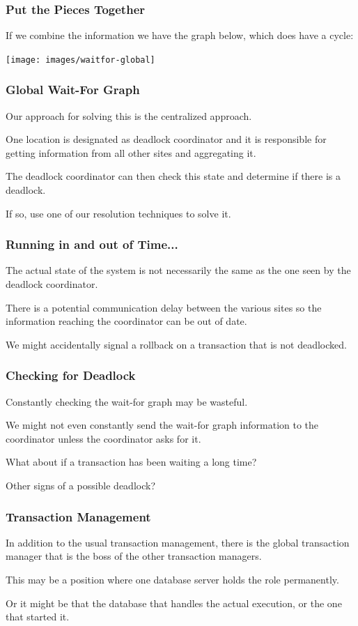 \begin{frame}
\frametitle{Put the Pieces Together}

If we combine the information we have the graph below, which does have a cycle:

\begin{center}
\texttt{[image: images/waitfor-global]}
\end{center}


\end{frame}

\begin{frame}
\frametitle{Global Wait-For Graph}

Our approach for solving this is the centralized approach.

One location is designated as deadlock coordinator and it is responsible for getting information from all other sites and aggregating it. 

The deadlock coordinator can then check this state and determine if there is a deadlock.

If so, use one of our resolution techniques to solve it.

\end{frame}

\begin{frame}
\frametitle{Running in and out of Time...}

The actual state of the system is not necessarily the same as the one seen by the deadlock coordinator. 

There is a potential communication delay between the various sites so the information reaching the coordinator can be out of date.

We might accidentally signal a rollback on a transaction that is not deadlocked.


\end{frame}

\begin{frame}
\frametitle{Checking for Deadlock}

Constantly checking the wait-for graph may be wasteful.

We might not even constantly send the wait-for graph information to the coordinator unless the coordinator asks for it.

What about if a transaction has been waiting a long time?

Other signs of a possible deadlock?

\end{frame}

\begin{frame}
\frametitle{Transaction Management}

In addition to the usual transaction management, there is the global transaction manager that is the boss of the other transaction managers. 

This may be a position where one database server holds the role permanently.

Or it might be that the database that handles the actual execution, or the one that started it.

\end{frame}

